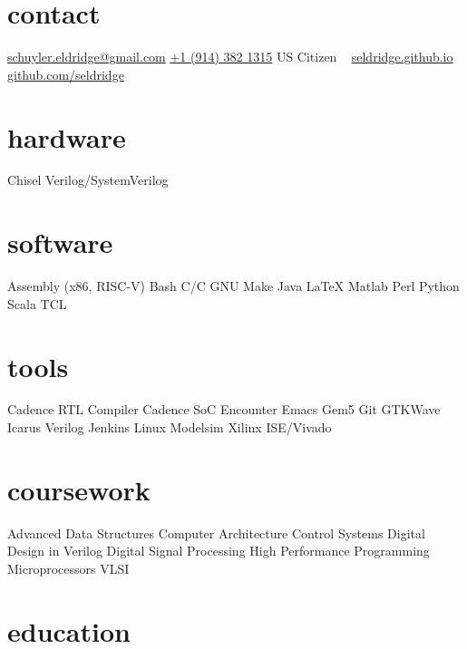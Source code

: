\documentclass[print]{friggeri-cv} %
\begin{document}


\newcommand{\CPP}
{C\nolinebreak[4]\hspace{-.05em}\raisebox{.22ex}{\footnotesize ++}\xspace}

\begin{aside} %
\section{contact}
\href{mailto:schuyler.eldridge@gmail.com}{schuyler.eldridge@gmail.com}
\href{tel:+19143821315}{+1 (914) 382 1315}
US Citizen
~
\href{https://seldridge.github.io}{seldridge.github.io}
\href{https://github.com/seldridge}{github.com/seldridge}
\section{hardware}
Chisel
Verilog/SystemVerilog
\section{software}
Assembly (x86, RISC-V)
Bash
C/\CPP
GNU Make
Java
\LaTeX
Matlab
Perl
Python
Scala
TCL
\section{tools}
Cadence RTL Compiler
Cadence SoC Encounter
Emacs
Gem5
Git
GTKWave
Icarus Verilog
Jenkins
Linux
Modelsim
Xilinx ISE/Vivado
\section{coursework}
Advanced Data Structures
Computer Architecture
Control Systems
Digital Design in Verilog
Digital Signal Processing
High Performance Programming
Microprocessors
VLSI
\end{aside}


\section{education}
\end{document}
